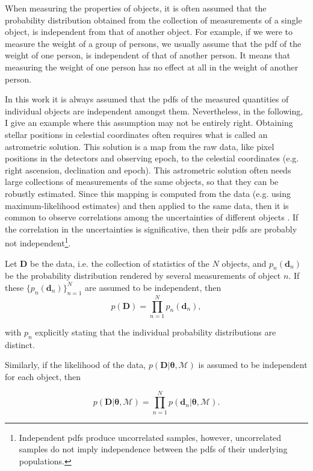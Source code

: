 When measuring the properties of objects, it is often assumed that the probability distribution obtained from the collection of measurements of a single object, is independent from that of another object. For example, if we were to measure the weight of a group of persons, we usually assume that the \gls{pdf} of the weight of one person, is independent of that of another person. It means that measuring the weight of one person has no effect at all in the weight of another person.


In this work it is always assumed that the \glspl{pdf}  of the measured quantities of individual objects are independent amongst them. Nevertheless, in the following, I give an example where this assumption may not be entirely right. Obtaining stellar positions in celestial coordinates often requires what is called an astrometric solution. This solution is a map from the raw data, like pixel positions in the detectors and observing epoch, to the celestial coordinates (e.g. right ascension, declination and epoch). This astrometric solution often needs large collections of measurements of the same objects, so that they can be robustly estimated. Since this mapping is computed from the data (e.g. using maximum-likelihood estimates) and then applied to the same data, then it is common to observe correlations among the uncertainties of different objects \cite[see for example][]{2010IAUS..261..320H,2017A&A...601A..19G}. If the correlation in the uncertainties is significative, then their \glspl{pdf}  are probably not independent\footnote{Independent \glspl{pdf}  produce uncorrelated samples, however, uncorrelated samples do not imply independence between the \glspl{pdf}  of their underlying populations.}.  


Let $\mathbf{D}$ be the data, i.e. the collection of statistics of the $N$ objects, and $p_n(\mathbf{d}_n)$ be the probability distribution rendered by several measurements of object $n$. If these $\{p_n(\mathbf{d}_n)\}_{n=1}^N$ are assumed to be independent, then
\begin{equation}
\label{eq:independence}
 p(\mathbf{D}) = \prod_{n=1}^N p_n(\mathbf{d}_n),
\end{equation}

 with $p_n$ explicitly stating that the individual probability distributions are distinct. 
 
Similarly, if the likelihood of the data, $p(\mathbf{D}|\boldsymbol{\theta},\mathcal{M})$ is assumed to be independent for each object, then

\begin{equation}
\label{eq:lik_datum}
 p(\mathbf{D}|\boldsymbol{\theta},\mathcal{M}) = \prod_{n=1}^N p(\mathbf{d}_n|\boldsymbol{\theta},\mathcal{M}).
\end{equation}

